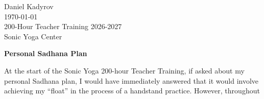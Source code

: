\documentclass[11pt]{article}
\begin{document}
 
\noindent
Daniel Kadyrov\\
\today\\
200-Hour Teacher Training 2026-2027\\
Sonic Yoga Center
 
\vspace{1em}
 
\begin{center}
  \textbf{Personal Sadhana Plan}
\end{center}

At the start of the Sonic Yoga 200-hour Teacher Training, if asked about my personal Sadhana plan, I would have immediately answered that it would involve achieving my ``float'' in the process of a handstand practice. However, throughout 


 






\end{document}

